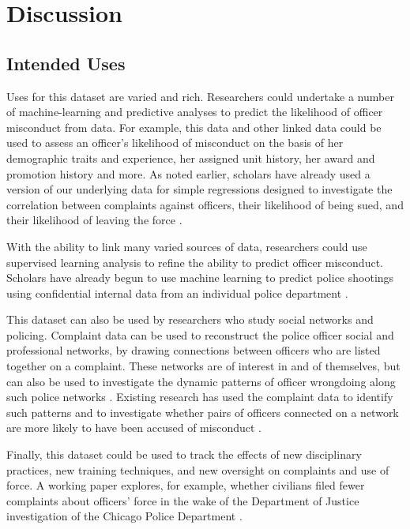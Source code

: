 \section{Discussion} \label{sec:discussion}

\subsection{Intended Uses}
Uses for this dataset are varied and rich. Researchers could undertake a number
of machine-learning and predictive analyses to predict the likelihood of
officer misconduct from data. For example, this data and other linked data
could be used to assess an officer's likelihood of misconduct on the basis of
her demographic traits and experience, her assigned unit history, her award and
promotion history and more. As noted earlier, scholars have already used a
version of our underlying data for simple regressions designed to investigate
the correlation between complaints against officers, their likelihood of being
sued, and their likelihood of leaving the force \cite{Rozema19}. 

With the ability to link many varied sources of data, researchers could use
supervised learning analysis to refine the ability to predict officer
misconduct. Scholars have already begun to use machine learning to predict
police shootings using confidential internal data from an individual police
department \cite{Helsby18}.

This dataset can also be used by researchers who study social networks and
policing. Complaint data can be used to reconstruct the police officer social
and professional networks, by drawing connections between officers who are
listed together on a complaint. These networks are of interest in and of
themselves, but can also be used to investigate the dynamic patterns of officer
wrongdoing along such police networks \cite{Roithmayr16}. Existing research has used the complaint
data to identify such patterns and to investigate whether pairs of officers
connected on a network are more likely to have been accused of misconduct \cite{Ouellet19}.

Finally, this dataset could be used to track the effects of new disciplinary
practices, new training techniques, and new oversight on complaints and use of
force. A working paper explores, for example, whether civilians filed fewer
complaints about officers' force in the wake of the Department of Justice
investigation of the Chicago Police Department \cite{Travers20}. 

